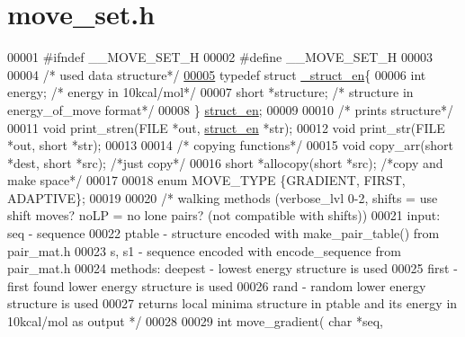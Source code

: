 \hypertarget{move__set_8h_source}{\section{move\+\_\+set.\+h}
\label{move__set_8h_source}
}

\begin{DoxyCode}
00001 \textcolor{preprocessor}{#ifndef \_\_MOVE\_SET\_H}
00002 \textcolor{preprocessor}{#define \_\_MOVE\_SET\_H}
00003 
00004 \textcolor{comment}{/* used data structure*/}
\hypertarget{move__set_8h_source_l00005}{}\hyperlink{struct__struct__en}{00005} \textcolor{keyword}{typedef} \textcolor{keyword}{struct }\hyperlink{struct__struct__en}{\_struct\_en}\{
00006   \textcolor{keywordtype}{int} energy;        \textcolor{comment}{/* energy in 10kcal/mol*/}
00007   \textcolor{keywordtype}{short} *structure;  \textcolor{comment}{/* structure in energy\_of\_move format*/}
00008 \} \hyperlink{struct__struct__en}{struct\_en};
00009 
00010 \textcolor{comment}{/* prints structure*/}
00011 \textcolor{keywordtype}{void} print\_stren(FILE *out, \hyperlink{struct__struct__en}{struct\_en} *str);
00012 \textcolor{keywordtype}{void} print\_str(FILE *out, \textcolor{keywordtype}{short} *str);
00013 
00014 \textcolor{comment}{/* copying functions*/}
00015 \textcolor{keywordtype}{void} copy\_arr(\textcolor{keywordtype}{short} *dest, \textcolor{keywordtype}{short} *src); \textcolor{comment}{/*just copy*/}
00016 \textcolor{keywordtype}{short} *allocopy(\textcolor{keywordtype}{short} *src);            \textcolor{comment}{/*copy and make space*/}
00017 
00018 \textcolor{keyword}{enum} MOVE\_TYPE \{GRADIENT, FIRST, ADAPTIVE\};
00019 
00020 \textcolor{comment}{/* walking methods (verbose\_lvl 0-2, shifts = use shift moves? noLP = no lone pairs? (not compatible with
       shifts))}
00021 \textcolor{comment}{    input:    seq - sequence}
00022 \textcolor{comment}{              ptable - structure encoded with make\_pair\_table() from pair\_mat.h}
00023 \textcolor{comment}{              s, s1 - sequence encoded with encode\_sequence from pair\_mat.h}
00024 \textcolor{comment}{    methods:  deepest - lowest energy structure is used}
00025 \textcolor{comment}{              first - first found lower energy structure is used}
00026 \textcolor{comment}{              rand - random lower energy structure is used}
00027 \textcolor{comment}{    returns local minima structure in ptable and its energy in 10kcal/mol as output */}
00028 
00029 \textcolor{keywordtype}{int} move\_gradient( \textcolor{keywordtype}{char} *seq,

\end{DoxyCode}
